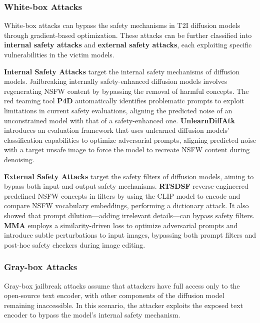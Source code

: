 \subsubsection{White-box Attacks}
White-box attacks can bypass the safety mechanisms in T2I diffusion models through gradient-based optimization. These attacks can be further classified into \textbf{internal safety attacks} and \textbf{external safety attacks}, each exploiting specific vulnerabilities in the victim models.


\textbf{Internal Safety Attacks} target the internal safety mechanisms of diffusion models.
Jailbreaking internally safety-enhanced diffusion models involves regenerating NSFW content by bypassing the removal of harmful concepts. The red teaming tool \textbf{P4D} \cite{chin2023prompting4debugging} automatically identifies problematic prompts to exploit limitations in current safety evaluations, aligning the predicted noise of an unconstrained model with that of a safety-enhanced one. \textbf{UnlearnDiffAtk} \cite{zhang2023generate} introduces an evaluation framework that uses unlearned diffusion models' classification capabilities to optimize adversarial prompts, aligning predicted noise with a target unsafe image to force the model to recreate NSFW content during denoising.


\textbf{External Safety Attacks} target the safety filters of diffusion models, aiming to bypass both input and output safety mechanisms. \textbf{RTSDSF} \cite{rando2022red} reverse-engineered predefined NSFW concepts in filters by using the CLIP model to encode and compare NSFW vocabulary embeddings, performing a dictionary attack. It also showed that prompt dilution—adding irrelevant details—can bypass safety filters. \textbf{MMA} \cite{yang2024mma} employs a similarity-driven loss to optimize adversarial prompts and introduce subtle perturbations to input images, bypassing both prompt filters and post-hoc safety checkers during image editing.


\subsubsection{Gray-box Attacks}
Gray-box jailbreak attacks assume that attackers have full access only to the open-source text encoder, with other components of the diffusion model remaining inaccessible. In this scenario, the attacker exploits the exposed text encoder to bypass the model's internal safety mechanism.

